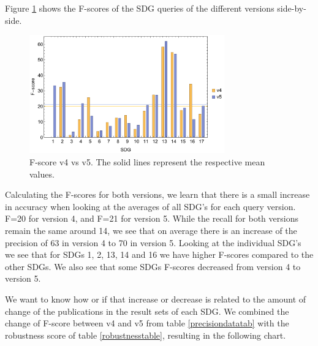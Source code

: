 \documentclass{article}
\begin{document}
Figure \ref{f1barchart} shows the F-scores of the SDG queries of the different versions side-by-side. 
\begin{figure}[H]
	\centering
  \includegraphics[width=0.75\textwidth]{figures/f1barchart.pdf}
	\caption{F-score v4 vs v5. The solid lines represent the respective mean values.}
	\label{f1barchart}
\end{figure}

Calculating the F-scores for both versions, we learn that there is a small increase in accuracy when looking at the averages of all SDG's for each query version. F=20 for version 4, and F=21 for version 5. While the recall for both versions remain the same around 14, we see that on average there is an increase of the precision of 63 in version 4 to 70 in version 5. 
Looking at the individual SDG's we see that for SDGs 1, 2, 13, 14 and 16 we have higher F-scores compared to the other SDGs. We also see that some SDGs F-scores decreased from version 4 to version 5.

We want to know how or if that increase or decrease is related to the amount of change of the publications in the result sets of each SDG. We combined the change of F-score between v4 and v5 from table \ref{precisiondatatab} with the robustness score of table \ref{robustnesstable}, resulting in the following chart. 
\end{document}
